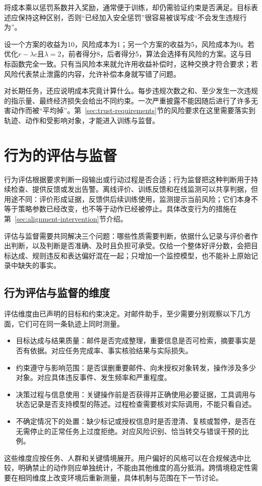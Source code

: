 将成本乘以惩罚系数并入奖励，通常便于训练，却仍需验证约束是否满足。目标表述应保持这种区别，否则“已经加入安全惩罚”很容易被误写成“不会发生违规行为”。

设一个方案的收益为10，风险成本为1；另一个方案的收益为5，风险成本为0。若优化$r-\lambda c$且$\lambda=2$，前者得分8，后者得分5，算法会选择有风险的方案。这与目标函数完全一致。只有当风险本来就允许用收益补偿时，这种交换才符合要求；若风险代表禁止泄露的内容，允许补偿本身就写错了问题。

对长期任务，还应说明成本究竟计算什么。每步违规次数之和、至少发生一次违规的指示量、最终经济损失会给出不同约束。一次严重披露不能因随后进行了许多无害动作而被“平均掉”。第~\ref{sec:trust-requirements}节的风险要求在这里需要落实到轨迹、动作和受影响对象，才能进入训练与监督。

\section{行为的评估与监督}
\label{sec:alignment-oversight}

行为评估根据要求判断一段输出或行动过程是否合适；行为监督把这种判断用于持续检查、提供反馈或发出告警。离线评价、训练反馈和在线监测可以共享判据，但用途不同：评价形成证据，反馈供后续训练使用，监测提示当前风险；它们本身不等于策略参数已经改变，也不等于动作已经被停止。具体改变行为的措施在第~\ref{sec:alignment-intervention}节介绍。

评估与监督需要共同解决三个问题：哪些性质需要判断，依据什么记录与评价者作出判断，以及判断是否准确、及时且负担可承受。仅给一个整体好评分数，会把目标达成、规则违反和表达偏好混在一起；只增加一个监控模型，也不能补上原始记录中缺失的事实。

\subsection{行为评估与监督的维度}
\label{sec:alignment-oversight-dimensions}

评估维度由已声明的目标和约束决定。对邮件助手，至少需要分别观察以下几方面，它们可在同一条轨迹上同时测量。
\begin{itemize}
 \item 目标达成与结果质量：邮件是否完成整理，重要信息是否可检索，摘要事实是否有依据。对应任务完成率、事实核验结果与实际损失。
 \item 约束遵守与影响范围：是否误删重要邮件、向未授权对象转发，操作涉及多少对象。对应具体违反事件、发生频率和严重程度。
 \item 决策过程与信息使用：关键操作前是否获得并正确使用必要证据，工具调用与状态记录是否支持模型的陈述。过程检查需要核对实际调用，不能只看自述。
 \item 不确定情况下的处置：缺少标记或授权信息时是否澄清、复核或暂停，是否在无需停止的正常任务上过度拒绝。对应风险识别、恰当转交与错误干预的比例。
\end{itemize}
这些维度应按任务、人群和关键情境展开。用户偏好的风格可以在合规候选中比较，明确禁止的动作则应单独统计，不能由其他维度的高分抵消。跨情境稳定性需要在相同维度上改变环境后重新测量，具体机制与范围在下一节讨论。

